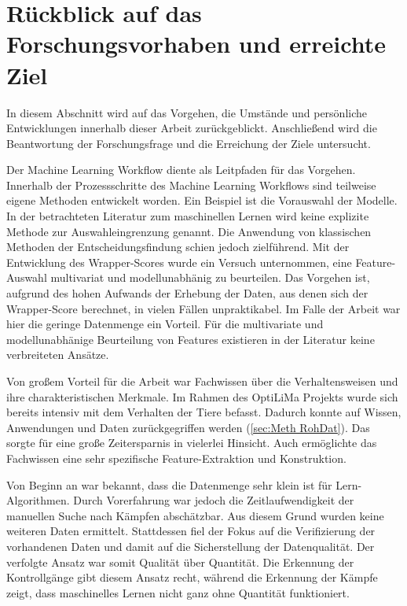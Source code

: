 \section{Rückblick auf das Forschungsvorhaben und erreichte Ziel}\label{sec:FrageundZiele!}

In diesem Abschnitt wird auf das Vorgehen, die Umstände und persönliche Entwicklungen innerhalb dieser Arbeit zurückgeblickt. Anschließend wird die Beantwortung der Forschungsfrage und die Erreichung der Ziele untersucht.

Der Machine Learning Workflow diente als Leitpfaden für das Vorgehen. Innerhalb der Prozessschritte des Machine Learning Workflows sind teilweise eigene Methoden entwickelt worden. Ein Beispiel ist die Vorauswahl der Modelle. In der betrachteten Literatur zum maschinellen Lernen wird keine explizite Methode zur Auswahleingrenzung genannt. Die Anwendung von klassischen Methoden der Entscheidungsfindung schien jedoch zielführend. Mit der Entwicklung des Wrapper-Scores wurde ein Versuch unternommen, eine Feature-Auswahl multivariat und modellunabhänig zu beurteilen. Das Vorgehen ist, aufgrund des hohen Aufwands der Erhebung der Daten, aus denen sich der Wrapper-Score berechnet, in vielen Fällen unpraktikabel. Im Falle der Arbeit war hier die geringe Datenmenge ein Vorteil. Für die  multivariate und modellunabhänige Beurteilung von Features existieren in der Literatur keine verbreiteten Ansätze. \par

Von großem Vorteil für die Arbeit war Fachwissen über die Verhaltensweisen und ihre charakteristischen Merkmale. Im Rahmen des \acrshort{OptiLiMa} Projekts wurde sich bereits intensiv mit dem Verhalten der Tiere befasst. Dadurch konnte auf Wissen, Anwendungen und Daten zurückgegriffen werden (\ref{sec:Meth RohDat}). Das sorgte für eine große Zeitersparnis in vielerlei Hinsicht. Auch ermöglichte das Fachwissen eine sehr spezifische Feature-Extraktion und Konstruktion. \par

Von Beginn an war bekannt, dass die Datenmenge sehr klein ist für Lern-Algorithmen. Durch Vorerfahrung war jedoch die Zeitlaufwendigkeit der manuellen Suche nach Kämpfen abschätzbar. Aus diesem Grund wurden keine weiteren Daten ermittelt. Stattdessen fiel der Fokus auf die Verifizierung der vorhandenen Daten und damit auf die Sicherstellung der Datenqualität. Der verfolgte Ansatz war somit Qualität über Quantität. Die Erkennung der Kontrollgänge gibt diesem Ansatz recht, während die Erkennung der Kämpfe zeigt, dass maschinelles Lernen nicht ganz ohne Quantität funktioniert. \par

